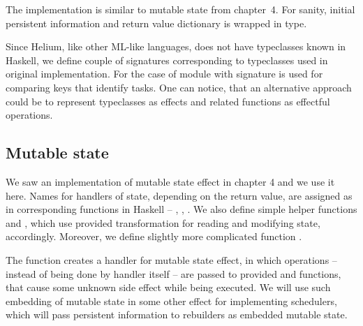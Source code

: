 

The implementation is similar to mutable state from chapter~4. For sanity, initial persistent information and return value dictionary is wrapped in  type.

Since Helium, like other ML-like languages, does not have typeclasses known in Haskell, we define couple of signatures corresponding to typeclasses used in original implementation. For the case of  module with signature  is used for comparing keys that identify tasks. One can notice, that an alternative approach could be to represent typeclasses as effects and related functions as effectful operations.

\begin{minipage}[t]{.45\textwidth}

  

\end{minipage}\hfill
\begin{minipage}[t]{.45\textwidth}

  

\end{minipage}

\subsection{Mutable state}

We saw an implementation of mutable state effect in chapter 4 and we use it here. Names for handlers of state, depending on the return value, are assigned as in corresponding functions in Haskell -- , , . We also define simple helper functions  and , which use provided transformation for reading and modifying state, accordingly. Moreover, we define slightly more complicated function . 



The  function creates a handler for mutable state effect, in which operations -- instead of being done by handler itself -- are passed to provided  and  functions, that cause some unknown side effect while being executed. We will use such embedding of mutable state in some other effect for implementing schedulers, which will pass persistent information to rebuilders as embedded mutable state.

